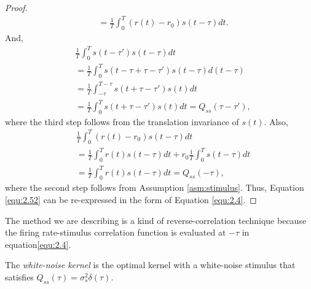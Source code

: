 \begin{proof}
\begin{equation}
\begin{aligned}
      &= \frac{1}{T}\int_0^{T}(r(t)-r_0)s(t-\tau)dt.
    \end{aligned}
  \end{equation}
  And,
  \begin{displaymath}
    \begin{aligned}
      &\frac{1}{T}\int_0^{T}s(t-\tau')s(t-\tau)dt\\
      &= \frac{1}{T}\int_0^{T}s(t-\tau+\tau-\tau')s(t-\tau)d(t-\tau)\\
      &= \frac{1}{T}\int_{-\tau}^{T-\tau}s(t+\tau-\tau')s(t)dt\\
      &= \frac{1}{T}\int_{0}^{T}s(t+\tau-\tau')s(t)dt = Q_{ss}(\tau-\tau'),
    \end{aligned}
  \end{displaymath}
  where the third step follows from the translation invariance of $s(t)$. Also,
  \begin{displaymath}
    \begin{aligned}
      &\frac{1}{T}\int_0^{T}(r(t)-r_0)s(t-\tau)dt\\
      &= \frac{1}{T}\int_0^{T}r(t)s(t-\tau)dt + r_0\frac{1}{T}\int_0^{T}s(t-\tau)dt\\
      &= \frac{1}{T}\int_0^{T}r(t)s(t-\tau)dt = Q_{ss}(-\tau),
    \end{aligned}
  \end{displaymath}
  where the second step follows from Assumption \ref{asm:stimulus}.
  Thus, Equation \ref{equ:2.52} can be re-expressed in the form of Equation \ref{equ:2.4}.
\end{proof}

\begin{rem}
  The method we are describing is a kind of reverse-correlation technique because the firing rate-stimulus correlation function is evaluated at $-\tau$ in equation\ref{equ:2.4}.
\end{rem}

\begin{defn}
  \label{def:WhiteNoiseKernel}
  The \emph{white-noise kernel} is the optimal kernel with a white-noise stimulus that satisfies $Q_{ss}(\tau) = \sigma_s^2\delta(\tau)$.
\end{defn}

